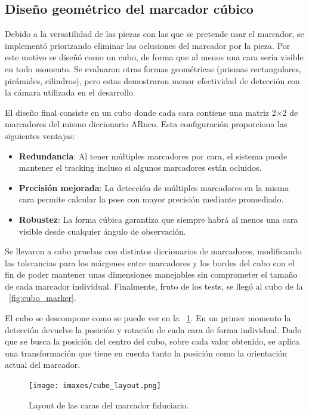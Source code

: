 \subsection{Diseño geométrico del marcador cúbico}

Debido a la versatilidad de las piezas con las que se pretende usar el marcador, se implementó priorizando eliminar las oclusiones del marcador por la pieza. Por este motivo se diseñó como un cubo, de forma que al menos una cara sería visible en todo momento. Se evaluaron otras formas geométricas (prismas rectangulares, pirámides, cilindros), pero estas demostraron menor efectividad de detección con la cámara utilizada en el desarrollo.

El diseño final consiste en un cubo donde cada cara contiene una matriz 2×2 de marcadores del mismo diccionario ARuco. Esta configuración proporciona las siguientes ventajas:

\begin{itemize}
    \item \textbf{Redundancia}: Al tener múltiples marcadores por cara, el sistema puede mantener el tracking incluso si algunos marcadores están ocluidos.
    \item \textbf{Precisión mejorada}: La detección de múltiples marcadores en la misma cara permite calcular la pose con mayor precisión mediante promediado.
    \item \textbf{Robustez}: La forma cúbica garantiza que siempre habrá al menos una cara visible desde cualquier ángulo de observación.
\end{itemize}

Se llevaron a cabo pruebas con distintos diccionarios de marcadores, modificando las tolerancias para los márgenes entre marcadores y los bordes del cubo con el fin de poder mantener unas dimensiones manejables sin comprometer el tamaño de cada marcador individual.
Finalmente, fruto de los tests, se llegó al cubo de la \figurename~\ref{fig:cubo_marker}.

El cubo se descompone como se puede ver en la \figurename~\ref{fig:cube_layout}. En un primer momento la detección devuelve la posición y rotación de cada cara de forma individual. Dado que se busca la posición del centro del cubo, sobre cada valor obtenido, se aplica una transformación que tiene en cuenta tanto la posición como la orientación actual del marcador. 

\begin{figure}
	\centering
	\texttt{[image: imaxes/cube\_layout.png]}
	\caption{Layout de las caras del marcador fiduciario.}
	\label{fig:cube_layout}
\end{figure}

